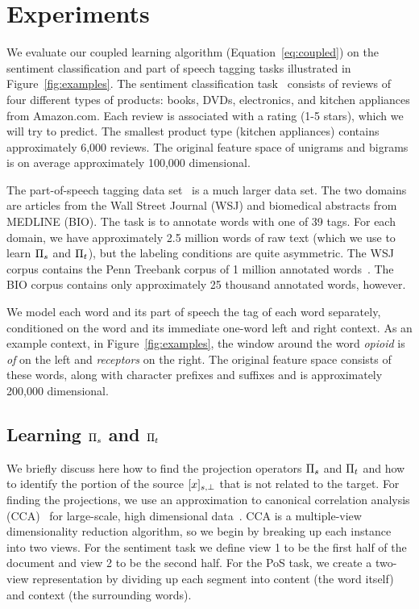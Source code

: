 \section{Experiments}
\label{sec:experiments}

We evaluate our coupled learning algorithm (Equation~\ref{eq:coupled})
on the sentiment classification and part of speech tagging tasks
illustrated in Figure~\ref{fig:examples}.  The sentiment classification
task~\cite{blitzer07,mansour09,dredze08} consists of reviews of four
different types of products: books, DVDs, electronics, and kitchen
appliances from Amazon.com.  Each review is associated with a rating
(1-5 stars), which we will try to predict.  The smallest product type
(kitchen appliances) contains approximately 6,000 reviews.  The
original feature space of unigrams and bigrams is on average
approximately 100,000 dimensional.  

The part-of-speech tagging data
set~\cite{blitzer06,huangyates,pennbioie} is a much larger data set.
The two domains are articles from the Wall Street Journal (WSJ) and
biomedical abstracts from MEDLINE (BIO).  The task is to annotate
words with one of 39 tags.  For each domain, we have approximately 2.5
million words of raw text (which we use to learn $\Pi_s$ and
$\Pi_t$), but the labeling conditions are quite asymmetric.  The WSJ
corpus contains the Penn Treebank corpus of 1 million annotated
words~\cite{penntb}.  The BIO corpus contains only approximately 25
thousand annotated words, however.

We model each word and its part of speech the tag of each word
separately, conditioned on the word and its immediate one-word left
and right context.  As an example context, in
Figure~\ref{fig:examples}, the window around the word \emph{opioid} is
\emph{of} on the left and \emph{receptors} on the right.  The original
feature space consists of these words, along with character prefixes
and suffixes and is approximately 200,000 dimensional.

\subsection{Learning $\Pi_s$ and $\Pi_t$}
\label{subsec:learning_projections}

We briefly discuss here how to find the projection operators $\Pi_s$
and $\Pi_t$ and how to identify the portion of the source ${[x]_{s,\perp}}$ that
is not related to the target.  For finding the projections, we use an
approximation to canonical correlation analysis
(CCA)~\cite{hotelling35} for large-scale, high dimensional
data~\cite{ando07,kakade07,fosterTR}.  CCA is a multiple-view
dimensionality reduction algorithm, so we begin by breaking up each
instance into two views.  For the sentiment task we define view 1 to
be the first half of the document and view 2 to be the second half.
For the PoS task, we create a two-view representation by dividing up
each segment into content (the word itself) and context (the
surrounding words).

